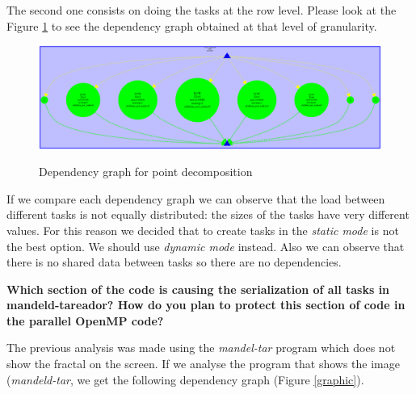 \documentclass[12]{article}
\begin{document}
The second one consists on doing the tasks at the row level. Please look at the Figure \ref{Row} to see the dependency graph obtained at that level of granularity. 


\begin{figure}[H]
\centering
\includegraphics[scale=0.2]{images/row_dependencygraph.png}
\label{Row}
\caption{Dependency graph for point decomposition}
\end{figure}


If we compare each dependency graph we can observe that the load between different tasks is not equally distributed: the sizes of the tasks have very different values. For this reason we decided that to create tasks in the \textit{static mode} is not the best option. We should use \textit{dynamic mode} instead. Also we can observe that there is no shared data between tasks so there are no dependencies. 


\textbf{Which section of the code is causing the serialization of all tasks in mandeld-tareador? How do you plan to protect this section of code in the parallel OpenMP code?
}

The previous analysis was made using the \textit{mandel-tar} program which does not show the fractal on the screen. If we analyse the program that shows the image (\textit{mandeld-tar}, we get the following dependency graph (Figure \ref{graphic}).
\end{document}
